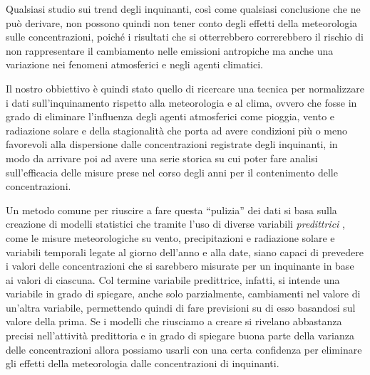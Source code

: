 \documentclass[a4paper]{report}
\begin{document}
Qualsiasi studio sui trend degli inquinanti, così come qualsiasi conclusione che ne può derivare, non possono quindi non tener conto degli effetti della meteorologia sulle concentrazioni, poiché i risultati che si otterrebbero correrebbero il rischio di non rappresentare il cambiamento nelle emissioni antropiche ma anche una variazione nei fenomeni atmosferici e negli agenti climatici.  

Il nostro obbiettivo è quindi stato quello di ricercare una tecnica per normalizzare i dati sull'inquinamento rispetto alla meteorologia e al clima, ovvero che fosse in grado di eliminare l'influenza degli agenti atmosferici come pioggia, vento e radiazione solare e della stagionalità che porta ad avere condizioni più o meno favorevoli alla dispersione dalle concentrazioni registrate degli inquinanti, in modo da arrivare poi ad avere una serie storica su cui poter fare analisi sull'efficacia delle misure prese nel corso degli anni per il contenimento delle concentrazioni.  

Un metodo comune per riuscire a fare questa ``pulizia''%
dei dati si basa sulla creazione di modelli statistici che tramite l'uso di diverse variabili \textit{predittrici}
, come le misure meteorologiche su vento, precipitazioni e radiazione solare e variabili temporali legate al giorno dell'anno e alla date, siano capaci di prevedere i valori delle concentrazioni che si sarebbero misurate per un inquinante in base ai valori di ciascuna. Col termine variabile predittrice, infatti, si intende una variabile in grado di spiegare, anche solo parzialmente, cambiamenti nel valore di un'altra variabile, permettendo quindi di fare previsioni su di esso basandosi sul valore della prima. Se i modelli che riusciamo a creare si rivelano abbastanza precisi nell'attività predittoria e in grado di spiegare buona parte della varianza delle concentrazioni allora possiamo usarli con una certa confidenza per eliminare gli effetti della meteorologia dalle concentrazioni di inquinanti.

\end{document}
